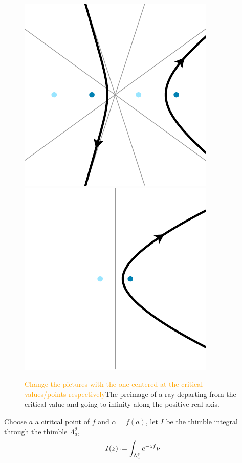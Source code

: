 \documentclass{article}
\newcommand*{\defeq}{\mathrel{\vcenter{\baselineskip0.5ex \lineskiplimit0pt
                     \hbox{\scriptsize.}\hbox{\scriptsize.}}}%
                     =}
\theoremstyle{definition}
\theoremstyle{plain}
\begin{document}
\begin{figure}[ht]
    \centering
    \includegraphics[scale=0.7]{figures/u_contour_5.pdf}
    \hspace{1cm}
    \includegraphics[scale=0.7]{figures/zeta_contour_5.pdf}
    \caption{\textcolor{orange}{Change the pictures with the one centered at the critical values/points respectively}The preimage of a ray departing from the critical value and going to infinity along the positive real axis.}
    \label{fig:thimble_vs_rays}
\end{figure}
Choose $a$ a ciritcal point of $f$ and $\alpha=f(a)$, let $I$ be the thimble integral through the thimble $\Lambda_a^\theta$,
\begin{equation}
I(z)\defeq\int_{\Lambda_a^\theta}e^{-zf}\nu
\end{equation}
\end{document}

